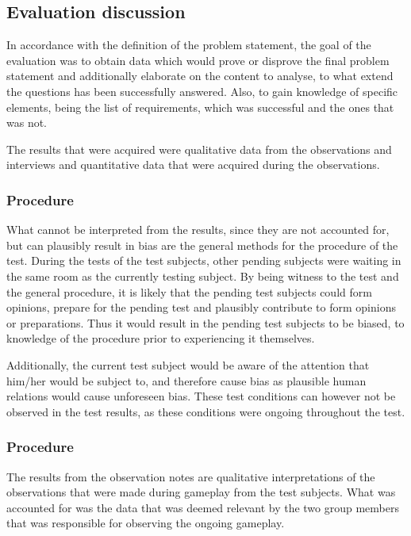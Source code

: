 \subsection{Evaluation discussion} \label{sec:evaldisc}
In accordance with the definition of the problem statement, the goal of the evaluation was to obtain data which would prove or disprove the final problem statement and additionally elaborate on the content to analyse, to what extend the questions has been successfully answered. 
Also, to gain knowledge of specific elements, being the list of requirements, which was successful and the ones that was not.

The results that were acquired were qualitative data from the observations and interviews and quantitative data that were acquired during the observations. 

\subsubsection*{Procedure}
What cannot be interpreted from the results, since they are not accounted for, but can plausibly result in bias are the general methods for the procedure of the test. 
During the tests of the test subjects, other pending subjects were waiting in the same room as the currently testing subject.
By being witness to the test and the general procedure, it is likely that the pending test subjects could form opinions, prepare for the pending test and plausibly contribute to form opinions or preparations. 
Thus it would result in the pending test subjects to be biased, to knowledge of the procedure prior to experiencing it themselves.

\noindent Additionally, the current test subject would be aware of the attention that him/her would be subject to, and therefore cause bias as plausible human relations would cause unforeseen bias. These test conditions can however not be observed in the test results, as these conditions were ongoing throughout the test.


\subsubsection*{Procedure}
The results from the observation notes are qualitative interpretations of the observations that were made during gameplay from the test subjects. 
What was accounted for was the data that was deemed relevant by the two group members that was responsible for observing the ongoing gameplay.
\bigskip

